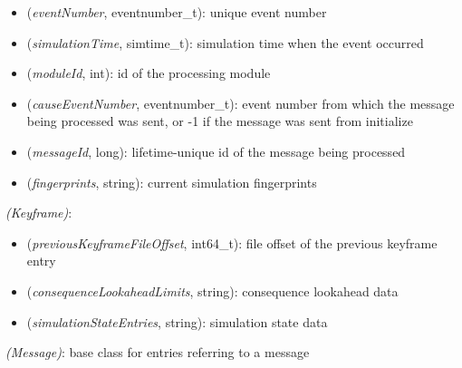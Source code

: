 \begin{itemize}
  \item \tbf{\#} (\textit{eventNumber}, eventnumber\_t): unique event number
  \item {} (\textit{simulationTime}, simtime\_t): simulation time when the event occurred
  \item {} (\textit{moduleId}, int): id of the processing module
  \item {} (\textit{causeEventNumber}, eventnumber\_t): event number from which the message being processed was sent, or -1 if the message was sent from initialize
  \item {} (\textit{messageId}, long): lifetime-unique id of the message being processed
  \item {} (\textit{fingerprints}, string): current simulation fingerprints
\end{itemize}

 \textit{(Keyframe)}: 

\begin{itemize}
  \item {} (\textit{previousKeyframeFileOffset}, int64\_t): file offset of the previous keyframe entry
  \item {} (\textit{consequenceLookaheadLimits}, string): consequence lookahead data
  \item {} (\textit{simulationStateEntries}, string): simulation state data
\end{itemize}

 \textit{(Message)}: base class for entries referring to a message

